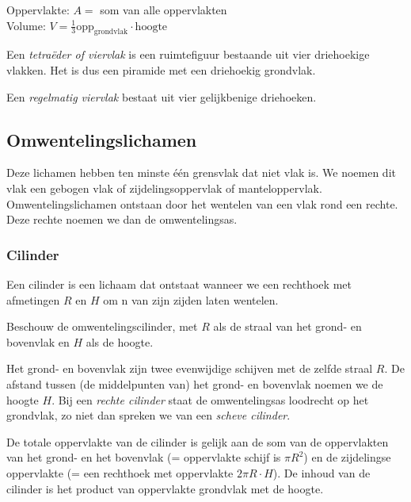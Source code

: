 \begin{ftonthoud}
	Oppervlakte: $A=$ som van alle oppervlakten
\\
Volume: $V=\frac{1}{3}\text{opp}_{\text{grondvlak}}\cdot \text{hoogte}$
\end{ftonthoud}

\begin{definitie}
	Een \emph{tetra\"eder of viervlak} is een ruimtefiguur bestaande uit vier driehoekige vlakken. Het is dus een piramide met een driehoekig grondvlak.

Een \emph{regelmatig viervlak} bestaat uit vier gelijkbenige driehoeken.

\end{definitie}

\subsection{Omwentelingslichamen}

Deze lichamen hebben ten minste \'e\'en grensvlak dat niet vlak is. We noemen dit vlak een gebogen vlak of zijdelingsoppervlak of manteloppervlak. Omwentelingslichamen ontstaan door het wentelen van een vlak rond een rechte. Deze rechte noemen we dan de omwentelingsas.

\subsubsection{Cilinder}
\begin{definitie}
	Een cilinder is een lichaam dat ontstaat wanneer we een rechthoek met afmetingen  $R$ en $H$ om n van zijn zijden laten wentelen.
\end{definitie}
 Beschouw de omwentelingscilinder, met $R$ als de straal van het grond- en bovenvlak en $H$ als de hoogte.

Het grond- en bovenvlak zijn twee evenwijdige schijven met de zelfde straal $R$. De afstand tussen (de middelpunten van) het grond- en bovenvlak noemen we de hoogte $H$. Bij een \emph{rechte cilinder} staat de omwentelingsas loodrecht op het grondvlak, zo niet dan spreken we van een \emph{scheve cilinder}.

De totale oppervlakte van de cilinder is gelijk aan de som van de oppervlakten van het grond- en het bovenvlak (= oppervlakte schijf is $\pi R^2$) en de zijdelingse oppervlakte (= een rechthoek met oppervlakte $2\pi R\cdot H$). De inhoud van de cilinder is het product van oppervlakte grondvlak met de hoogte.


